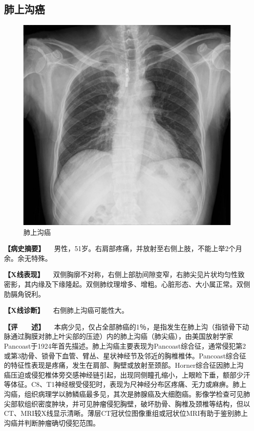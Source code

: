 \subsection{肺上沟癌}

\begin{figure}[!htbp]
 \centering
 \includegraphics{./images/Image00168.jpg}
 \captionsetup{justification=centering}
 \caption{肺上沟癌}
 \label{fig3-8-6}
  \end{figure} 

\textbf{【病史摘要】}
　男性，51岁。右肩部疼痛，并放射至右侧上肢，不能上举2个月余。余无特殊。

\textbf{【X线表现】}
　双侧胸廓不对称，右侧上部肋间隙变窄，右肺尖见片状均匀性致密影，其内缘及下缘隆起。双侧肺纹理增多、增粗。心脏形态、大小属正常。双侧肋膈角锐利。

\textbf{【X线诊断】} 　右侧肺上沟癌可能性大。

\textbf{【评　　述】}
　本病少见，仅占全部肺癌的1％，是指发生在肺上沟（指锁骨下动脉通过胸膜对肺上叶尖部的压迹）内的肺上沟癌（肺尖癌），由美国放射学家Pancoast于1924年首先描述。肺上沟癌主要表现为Pancoast综合征，通常侵犯第2或第3肋骨、锁骨下血管、臂丛、星状神经节及邻近的胸椎椎体。Pancoast综合征的特征性表现是疼痛，发生在肩部、胸壁或放射至颈部。Horner综合征因肺上沟癌压迫或侵犯椎体旁交感神经链引起，出现同侧瞳孔缩小，上眼睑下垂，额部少汗等体征。C8、T1神经根受侵犯时，表现为尺神经分布区疼痛、无力或麻痹。肺上沟癌，组织病理学以肺鳞癌最多见，其次是肺腺癌及大细胞癌。影像学检查可见肺尖部软组织密度肿块，并可见肿瘤侵犯胸壁，破坏肋骨、胸椎及颈椎等结构，但以CT、MRI较X线显示清晰。薄层CT冠状位图像重组或冠状位MRI有助于鉴别肺上沟癌并判断肿瘤确切侵犯范围。

